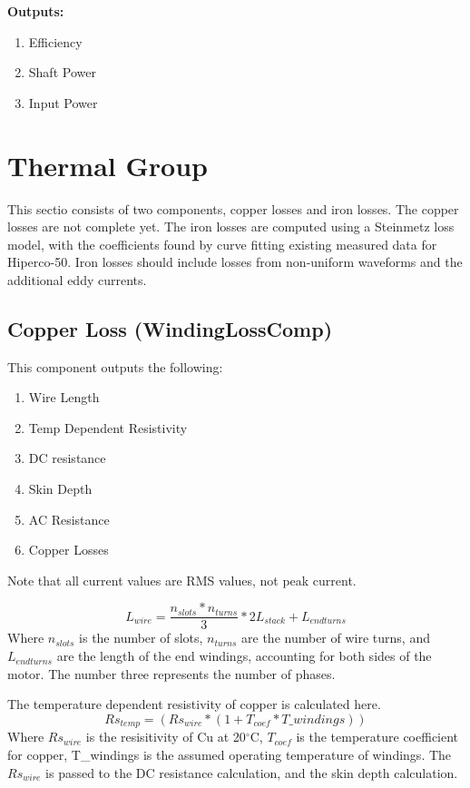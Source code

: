 \documentclass[10pt]{article}
\begin{document}
\textbf{Outputs:}
\begin{enumerate}
    \item Efficiency
    \item Shaft Power
    \item Input Power
\end{enumerate}

\section{Thermal Group}

This sectio consists of two components, copper losses and iron losses. The copper losses are not complete yet. The iron losses are computed using a Steinmetz loss model, with the coefficients found by curve fitting existing measured data for Hiperco-50. Iron losses should include losses from non-uniform waveforms and the additional eddy currents.


\subsection{Copper Loss (WindingLossComp)}
This component outputs the following:
\begin{enumerate}
    \item Wire Length
    \item Temp Dependent Resistivity
    \item DC resistance
    \item Skin Depth
    \item AC Resistance
    \item Copper Losses
\end{enumerate}
Note that all current values are RMS values, not peak current.

\begin{equation}
    L_{wire} = \frac{n_{slots}*n_{turns}}{3} * 2L_{stack} + L_{endturns}
\end{equation}
Where $n_{slots}$ is the number of slots, $n_{turns}$ are the number of wire turns, and $L_{endturns}$ are the length of the end windings, accounting for both sides of the motor. The number three represents the number of phases.

The temperature dependent resistivity of copper is calculated here.
\begin{equation}
    Rs_{temp} = (Rs_{wire} * (1+T_{coef}*T\_windings))
\end{equation}
Where $Rs_{wire}$ is the resisitivity of Cu at 20$^\circ$C, $T_{coef}$ is the temperature coefficient for copper, T\_windings is the assumed operating temperature of windings. The $Rs_{wire}$ is passed to the DC resistance calculation, and the skin depth calculation.
\end{document}
